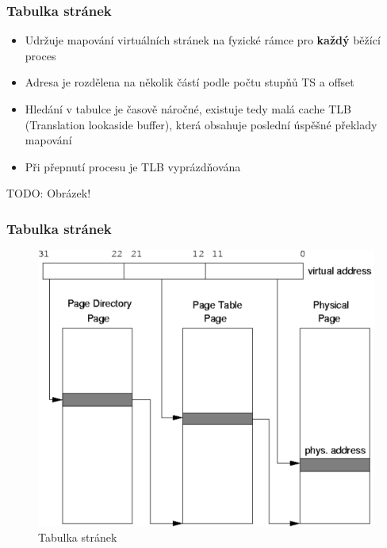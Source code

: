 \documentclass[professionalfonts,svgnames]{beamer}
\begin{document}
 \begin{frame}
\frametitle{Tabulka stránek}
\begin{itemize}
\item Udržuje mapování virtuálních stránek na fyzické rámce pro \textbf{každý} běžící proces
\item Adresa je rozdělena na několik částí podle počtu stupňů TS a offset
\item Hledání v tabulce je časově náročné, existuje tedy malá cache TLB (Translation lookaside buffer), která obsahuje poslední úspěšné překlady mapování
\item Při přepnutí procesu je TLB vyprázdňována
\end{itemize}
TODO: Obrázek!
\end{frame}

\begin{frame}
\frametitle{Tabulka stránek}
\begin{figure}[h]
	\includegraphics[scale=0.4]{fig/pgtable}
	\caption{Tabulka stránek}
	\label{vm}
\end{figure}
\end{frame}
\end{document}
